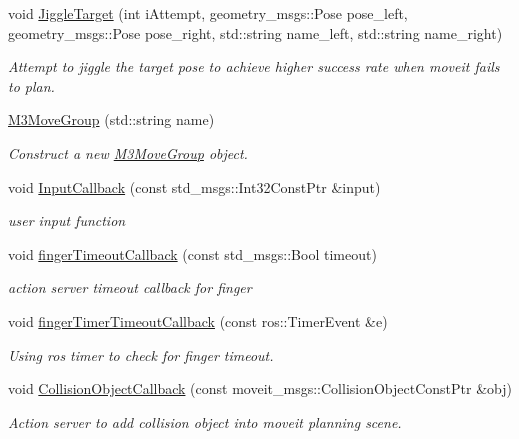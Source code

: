 \begin{DoxyCompactItemize}
void \hyperlink{classM3MoveGroup_a01c4d2e768a050ad0652ecc2b612946c}{Jiggle\+Target} (int i\+Attempt, geometry\+\_\+msgs\+::\+Pose pose\+\_\+left, geometry\+\_\+msgs\+::\+Pose pose\+\_\+right, std\+::string name\+\_\+left, std\+::string name\+\_\+right)
\begin{DoxyCompactList}\small\item\em Attempt to jiggle the target pose to achieve higher success rate when moveit fails to plan. \end{DoxyCompactList}\item 
\hyperlink{classM3MoveGroup_aeb66c992c2a648e53f823a6058669c4c}{M3\+Move\+Group} (std\+::string name)
\begin{DoxyCompactList}\small\item\em Construct a new \hyperlink{classM3MoveGroup}{M3\+Move\+Group} object. \end{DoxyCompactList}\item 
void \hyperlink{classM3MoveGroup_a0d53e8cfafd00e1a22f1cf5e091b63a1}{Input\+Callback} (const std\+\_\+msgs\+::\+Int32\+Const\+Ptr \&input)
\begin{DoxyCompactList}\small\item\em user input function \end{DoxyCompactList}\item 
void \hyperlink{classM3MoveGroup_a754821f89a28e5b3e6924d9f9e040946}{finger\+Timeout\+Callback} (const std\+\_\+msgs\+::\+Bool timeout)
\begin{DoxyCompactList}\small\item\em action server timeout callback for finger \end{DoxyCompactList}\item 
void \hyperlink{classM3MoveGroup_a78c1d36f86d5ade3dc73b6239227a512}{finger\+Timer\+Timeout\+Callback} (const ros\+::\+Timer\+Event \&e)
\begin{DoxyCompactList}\small\item\em Using ros timer to check for finger timeout. \end{DoxyCompactList}\item 
void \hyperlink{classM3MoveGroup_ada2b7b9e5a402676eff8747267385f6b}{Collision\+Object\+Callback} (const moveit\+\_\+msgs\+::\+Collision\+Object\+Const\+Ptr \&obj)
\begin{DoxyCompactList}\small\item\em Action server to add collision object into moveit planning scene. \end{DoxyCompactList}\item 

\end{DoxyCompactItemize}
